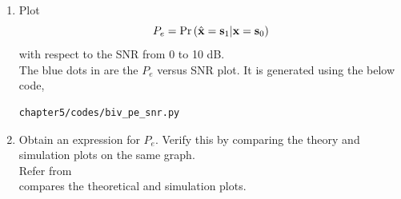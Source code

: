 \begin{enumerate}
%
\item
Plot 
\begin{equation} 
P_e = \Pr\left(\hat{\mathbf{x}} = \mathbf{s}_1|\mathbf{x} = \mathbf{s}_0\right)
\label{eq:prob_error_fsk}
\end{equation}
with respect to the SNR from 0 to 10 dB.\\
\solution The blue dots in  are the $P_e$ versus SNR plot. It is generated using the below code,
\begin{lstlisting}
chapter5/codes/biv_pe_snr.py
\end{lstlisting}
%
\item
Obtain an expression for $P_e$. Verify this by comparing the theory and simulation plots on the same graph.\\
\solution 
Refer from  \\
 compares the theoretical and simulation plots.


\end{enumerate}
